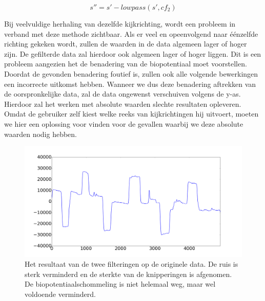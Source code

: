 \documentclass{article}
\begin{document}
\begin{equation}
\label{eq:aftrekkingbiopotentiaal}
s'' = s' - lowpass(s', cf_2)
\end{equation}

Bij veelvuldige herhaling van dezelfde kijkrichting, wordt een probleem in verband met deze methode zichtbaar. Als er veel en opeenvolgend naar éénzelfde richting gekeken wordt, zullen de waarden in de data algemeen lager of hoger zijn. De gefilterde data zal hierdoor ook algemeen lager of hoger liggen. Dit is een probleem aangezien het de benadering van de biopotentiaal moet voorstellen. Doordat de gevonden benadering foutief is, zullen ook alle volgende bewerkingen een incorrecte uitkomst hebben. Wanneer we dus deze benadering aftrekken van de oorspronkelijke data, zal de data ongewenst verschuiven volgens de y-as. Hierdoor zal het werken met absolute waarden slechte resultaten opleveren. Omdat de gebruiker zelf kiest welke reeks van kijkrichtingen hij uitvoert, moeten we hier een oplossing voor vinden voor de gevallen waarbij we deze absolute waarden nodig hebben.

\begin{figure}[h]
\centering
\includegraphics[width=\linewidth]{images/filtered_data}
\caption{Het resultaat van de twee filteringen op de originele data. De ruis is sterk verminderd en de sterkte van de knipperingen is afgenomen. De biopotentiaalschommeling is niet helemaal weg, maar wel voldoende verminderd.}
\label{fig:filtereddata}
\end{figure}
\end{document}
